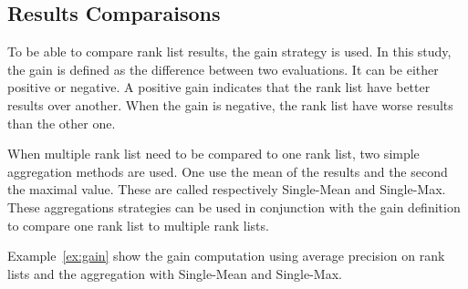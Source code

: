 \subsection{Results Comparaisons \label{sec:results_comparaison}}

To be able to compare rank list results, the gain strategy is used.
In this study, the gain is defined as the difference between two evaluations.
It can be either positive or negative.
A positive gain indicates that the rank list have better results over another.
When the gain is negative, the rank list have worse results than the other one.

When multiple rank list need to be compared to one rank list, two simple aggregation methods are used.
One use the mean of the results and the second the maximal value.
These are called respectively Single-Mean and Single-Max.
These aggregations strategies can be used in conjunction with the gain definition to compare one rank list to multiple rank lists.

Example~\ref{ex:gain} show the gain computation using average precision on rank lists and the aggregation with Single-Mean and Single-Max.

